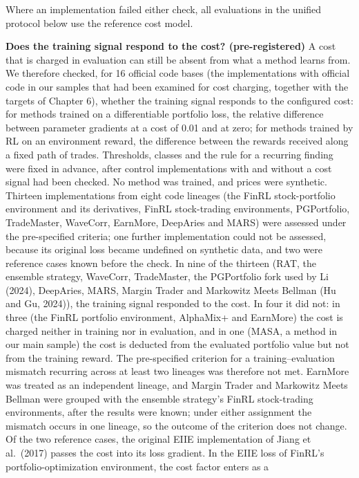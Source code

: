 \documentclass[12pt,a4paper]{report}
\begin{document}
Where an implementation failed either check, all evaluations in the
unified protocol below use the reference cost model.

\textbf{Does the training signal respond to the cost? (pre-registered)}
A cost that is charged in evaluation can still be absent from what a
method learns from. We therefore checked, for 16 official code bases
(the implementations with official code in our samples that had been
examined for cost charging, together with the targets of Chapter 6),
whether the training signal responds to the configured cost: for methods
trained on a differentiable portfolio loss, the relative difference
between parameter gradients at a cost of 0.01 and at zero; for methods
trained by RL on an environment reward, the difference between the
rewards received along a fixed path of trades. Thresholds, classes and
the rule for a recurring finding were fixed in advance, after control
implementations with and without a cost signal had been checked. No
method was trained, and prices were synthetic. Thirteen implementations
from eight code lineages (the FinRL stock-portfolio environment and its
derivatives, FinRL stock-trading environments, PGPortfolio, TradeMaster,
WaveCorr, EarnMore, DeepAries and MARS) were assessed under the
pre-specified criteria; one further implementation could not be
assessed, because its original loss became undefined on synthetic data,
and two were reference cases known before the check. In nine of the
thirteen (RAT, the ensemble strategy, WaveCorr, TradeMaster, the
PGPortfolio fork used by Li (2024), DeepAries, MARS, Margin Trader and
Markowitz Meets Bellman (Hu and Gu, 2024)), the training signal
responded to the cost. In four it did not: in three (the FinRL portfolio
environment, AlphaMix+ and EarnMore) the cost is charged neither in
training nor in evaluation, and in one (MASA, a method in our main
sample) the cost is deducted from the evaluated portfolio value but not
from the training reward. The pre-specified criterion for a
training--evaluation mismatch recurring across at least two lineages was
therefore not met. EarnMore was treated as an independent lineage, and
Margin Trader and Markowitz Meets Bellman were grouped with the ensemble
strategy's FinRL stock-trading environments, after the results were
known; under either assignment the mismatch occurs in one lineage, so
the outcome of the criterion does not change. Of the two reference
cases, the original EIIE implementation of Jiang et al.~(2017) passes
the cost into its loss gradient. In the EIIE loss of FinRL's
portfolio-optimization environment, the cost factor enters as a
\end{document}
